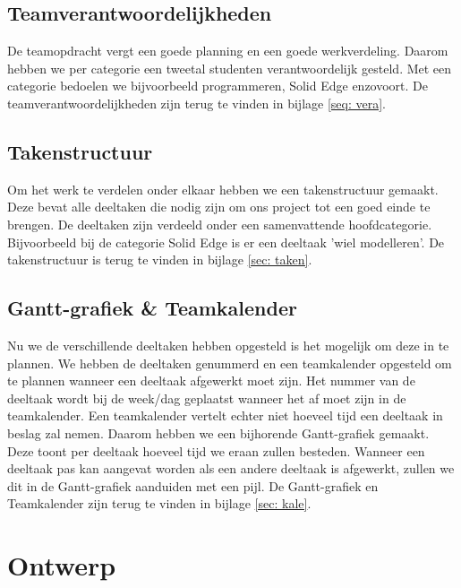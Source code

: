 \documentclass[a4paper,twoside,kulak]{kulakreport}
\begin{document}
	\subsection*{Teamverantwoordelijkheden}De teamopdracht vergt een goede planning en een goede werkverdeling. Daarom hebben we per categorie een tweetal studenten verantwoordelijk gesteld. Met een categorie bedoelen we bijvoorbeeld programmeren, Solid Edge enzovoort. De teamverantwoordelijkheden zijn terug te vinden in bijlage \ref{seq: vera}.
	 
	\subsection*{Takenstructuur}Om het werk te verdelen onder elkaar hebben we een takenstructuur gemaakt. Deze bevat alle deeltaken die nodig zijn om ons project tot een goed einde te brengen. De deeltaken zijn verdeeld onder een samenvattende hoofdcategorie. Bijvoorbeeld bij de categorie Solid Edge is er een deeltaak 'wiel modelleren'. De takenstructuur is terug te vinden in bijlage \ref{sec: taken}.
	\subsection*{Gantt-grafiek \& Teamkalender} Nu we de verschillende deeltaken hebben opgesteld is het mogelijk om deze in te plannen. We hebben de deeltaken genummerd en een teamkalender opgesteld om te plannen wanneer een deeltaak afgewerkt moet zijn. Het nummer van de deeltaak wordt bij de week/dag geplaatst wanneer het af moet zijn in de teamkalender. Een teamkalender vertelt echter niet hoeveel tijd een deeltaak in beslag zal nemen. Daarom hebben we een bijhorende Gantt-grafiek gemaakt. Deze toont per deeltaak hoeveel tijd we eraan zullen besteden. Wanneer een deeltaak pas kan aangevat worden als een andere deeltaak is afgewerkt, zullen we dit in de Gantt-grafiek aanduiden met een pijl. De Gantt-grafiek en Teamkalender zijn terug te vinden in bijlage \ref{sec: kale}.
	
	\section{Ontwerp}
\end{document}
